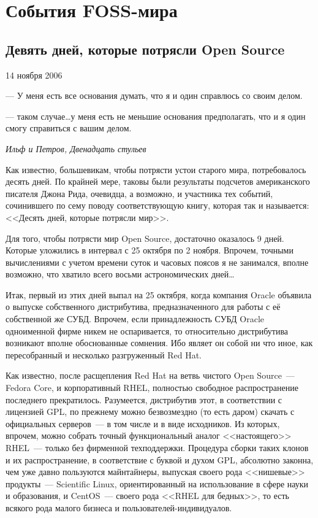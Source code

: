 \chapter{События FOSS-мира}

\section{Девять дней, которые потрясли Open Source} 
\begin{timeline}
14 ноября 2006
\end{timeline}

\hfill \begin{minipage}[h]{0.45\textwidth}
— У меня есть все основания думать, что я и один справлюсь со своим делом.

—  таком случае\dots у меня есть не меньшие основания предполагать, что и я один смогу справиться с вашим делом.
\begin{flushright}
\textit{Ильф и Петров, Двенадцать стульев}
\end{flushright}
\bigskip\end{minipage}

Как известно, большевикам, чтобы потрясти устои старого мира, потребовалось десять дней. По крайней мере, таковы были результаты подсчетов американского писателя Джона Рида, очевидца, а возможно, и участника тех событий, сочинившего по сему поводу соответствующую книгу, которая так и называется: <<Десять дней, которые потрясли мир>>.

Для того, чтобы потрясти мир Open Source, достаточно оказалось 9 дней. Которые уложились в интервал с 25 октября по 2 ноября. Впрочем, точными вычислениями с учетом времени суток и часовых поясов я не занимался, вполне возможно, что хватило всего восьми астрономических дней\dots

Итак, первый из этих дней выпал на 25 октября, когда компания Oracle объявила о выпуске собственного дистрибутива, предназначенного для работы с её собственной же СУБД. Впрочем, если принадлежность СУБД Oracle одноименной фирме никем не оспаривается, то относительно дистрибутива возникают вполне обоснованные сомнения. Ибо являет он собой ни что иное, как пересобранный и несколько разгруженный Red Hat.

Как известно, после расщепления Red Hat на ветвь чистого Open Source~--- Fedora Core, и корпоративный RHEL, полностью свободное распространение последнего прекратилось. Разумеется, дистрибутив этот, в соответствии с лицензией GPL, по прежнему можно безвозмездно (то есть даром) скачать с официальных серверов~--- в том числе и в виде исходников. Из которых, впрочем, можно собрать точный функциональный аналог <<настоящего>> RHEL~--- только без фирменной техподдержки. Процедура сборки таких клонов и их распространение, в соответствие с буквой и духом GPL, абсолютно законна, чем уже давно пользуются майнтайнеры, выпуская своего рода <<нишевые>> продукты~--- Scientific Linux, ориентированный на использование в сфере науки и образования, и CentOS~--- своего рода <<RHEL для бедных>>, то есть всякого рода малого бизнеса и пользователей-индивидуалов.

